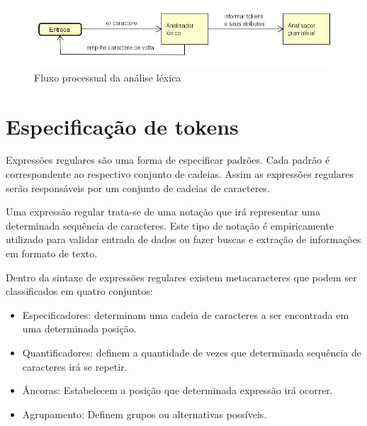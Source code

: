 \begin{figure}[htp!]
\centering
\includegraphics[width=\textwidth]{figuras/flxlexico.png}
\caption{Fluxo processual da análise léxica}
\label{figura1}
\end{figure}

\section{Especificação de tokens}\label{labelS1}
Expressões regulares são uma forma de especificar padrões. Cada padrão é correspondente ao respectivo conjunto de cadeias. Assim as expressões regulares serão responsáveis por um conjunto de cadeias de caracteres.
\par Uma expressão regular trata-se de uma notação que irá representar uma determinada sequência de caracteres. Este tipo de notação é empiricamente utilizado para validar entrada de dados ou fazer buscas e extração de informações em formato de texto.
\par Dentro da sintaxe de expressões regulares existem metacaracteres que podem ser classificados em quatro conjuntos:

\begin{itemize}
\item  Especificadores: determinam uma cadeia de caracteres a ser encontrada em uma determinada posição.
\item Quantificadores:  definem a quantidade de vezes que determinada sequência de caracteres irá se repetir.
\item Âncoras: Estabelecem a posição que determinada expressão irá ocorrer.
\item Agrupamento: Definem grupos ou alternativas possíveis.
\end{itemize}

